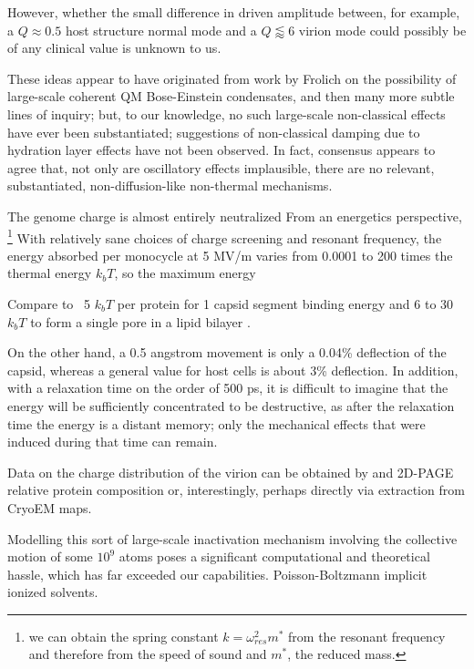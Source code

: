 \documentclass[paper.tex]{subfiles}
\begin{document}
However, whether the small difference in driven amplitude between, for example, a $Q\approx0.5$ host structure normal mode and a $Q\lessapprox6$ virion mode could possibly be of any clinical value is unknown to us. 



These ideas appear to have originated from work by Frolich\cite{Longrange1968}\cite{Evidence1983}\cite{Biological1980}\cite{Coherence1983} on the possibility of large-scale coherent QM Bose-Einstein condensates, and then many more subtle lines of inquiry\cite{Mechanisms1992}\cite{mechanisms1981}; but, to our knowledge, no such large-scale non-classical effects have ever been substantiated; suggestions of non-classical damping due to hydration layer effects have not been observed. In fact, consensus\cite{Exposure2009}\cite{ICNIRP2020}\cite{C95} appears to agree that, not only are oscillatory effects implausible, there are no relevant, substantiated, non-diffusion-like non-thermal mechanisms. 

The genome charge is almost entirely neutralized  From an energetics perspective, \footnote{we can obtain the spring constant $k = \omega_{res}^2 m^*$ from the resonant frequency and therefore from the speed of sound and $m^*$, the reduced mass.} With relatively sane choices of charge screening and resonant frequency, the energy absorbed per monocycle at 5 MV/m varies from 0.0001 to 200 times the thermal energy $k_b T$, so the maximum energy 

Compare to ~5 $k_b T$ per protein for 1 capsid segment binding energy \cite{Energies2012} \cite{Weak2002} and 6 to 30 $k_b T$ to form a single pore in a lipid bilayer \cite{Atomistic2014a}.

On the other hand, a 0.5 angstrom movement is only a 0.04\% deflection of the capsid, whereas a general value for host cells is about 3\% deflection. In addition, with a relaxation time on the order of 500 ps, it is difficult to imagine that the energy will be sufficiently concentrated to be destructive, as after the relaxation time the energy is a distant memory; only the mechanical effects that were induced during that time can remain.

Data on the charge distribution of the virion can be obtained by and 2D-PAGE relative protein composition or, interestingly, perhaps directly via extraction from CryoEM maps.



Modelling this sort of large-scale inactivation mechanism involving the collective motion of some $10^9$ atoms poses a significant computational and theoretical hassle, which has far exceeded our capabilities. Poisson-Boltzmann implicit ionized solvents. 
\end{document}
